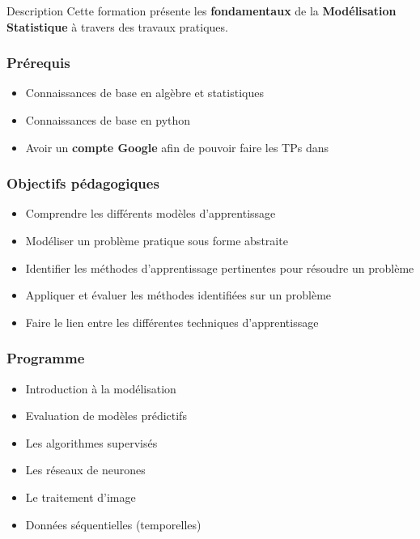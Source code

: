 
\begin{frame}{Description}
  Cette formation présente les \textbf{fondamentaux} de la \textbf{Modélisation Statistique} à travers des travaux pratiques.
\end{frame}

\begin{frame}
  \frametitle{Prérequis}
  \begin{itemize}
  \item Connaissances de base en algèbre et statistiques
  \item Connaissances de base en python
  \item Avoir un \textbf{compte Google} afin de pouvoir faire les TPs dans 
  \end{itemize}
\end{frame}

\begin{frame}
  \frametitle{Objectifs pédagogiques}
  \begin{itemize}
  \item Comprendre les différents modèles d'apprentissage
  \item Modéliser un problème pratique sous forme abstraite
  \item Identifier les méthodes d'apprentissage pertinentes pour résoudre un problème
  \item Appliquer et évaluer les méthodes identifiées sur un problème
  \item Faire le lien entre les différentes techniques d'apprentissage
  \end{itemize}
\end{frame}

\begin{frame}
  \frametitle{Programme}
  \begin{itemize}
  \item Introduction à la modélisation
  \item Evaluation de modèles prédictifs
  \item Les algorithmes supervisés
  \item Les réseaux de neurones
  \item Le traitement d'image
  \item Données séquentielles (temporelles)
  \end{itemize}
\end{frame}
